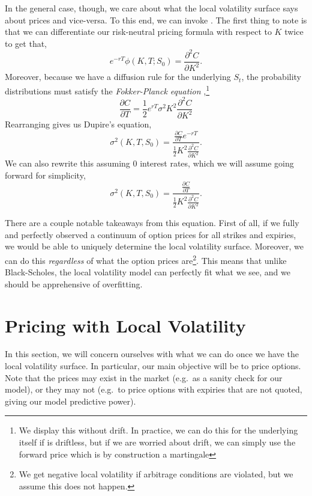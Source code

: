 \documentclass[12pt]{article}
\numberwithin{equation}{section}
\begin{document}
In the general case, though, we care about what the local volatility surface
says about prices and vice-versa. To this end, we can invoke \cite{dupire1997pricing}. The first thing to note is that we can
differentiate our risk-neutral pricing formula with respect to $K$ twice to get
that,
\begin{equation}
 e^{-rT} \phi(K, T; S_0) = \frac{\partial^2 C}{\partial K^2}.
\end{equation}
Moreover, because we have a diffusion rule for the underlying $S_t$, the
probability distributions must satisfy 
the \emph{Fokker-Planck equation} \citep{risken1996fokker},\footnote{We
display this without drift. In practice, we can do this for the underlying
itself if is driftless, but if we are worried about drift, we can simply use the
forward price which is by construction a martingale}
\begin{equation}
 \frac{\partial C}{\partial T} = \frac{1}{2} e^{rT} \sigma^2 K^2 \frac{\partial^2
C}{\partial K^2}
\end{equation}
Rearranging gives us Dupire's equation,
\begin{equation}
 \sigma^2(K, T, S_0) = \frac{ \frac{\partial C}{\partial T} e^{-rT}}
{\frac{1}{2} K^2 \frac{\partial^2 C}{\partial K^2}}.
\end{equation}
We can also rewrite this assuming 0 interest rates, which we will assume going
forward for simplicity,
\begin{equation}
 \sigma^2(K, T, S_0) = \frac{ \frac{\partial C}{\partial T}}
{\frac{1}{2} K^2 \frac{\partial^2 C}{\partial K^2}}.
\end{equation}

There are a couple notable takeaways from this equation. First of all, if we
fully and perfectly observed a continuum of option prices for all strikes and
expiries, we would be able to uniquely determine the local volatility surface.
Moreover, we can do this \emph{regardless} of what the option prices
are\footnote{We get negative local volatility if arbitrage conditions are violated,
but we assume this does not happen.}. This means that unlike Black-Scholes, the
local volatility model can perfectly fit what we see, and we should be
apprehensive of overfitting.


\section{Pricing with Local Volatility}
\label{sec:localvolpricing}

In this section, we will concern ourselves with what we can do once we have the
local volatility surface. In particular, our main objective will be to 
price options. Note that the prices may exist in the market (e.g.\ as a sanity
check for our model), or they may not (e.g.\ to price options with expiries that
are not quoted, giving our model predictive power).
\end{document}
